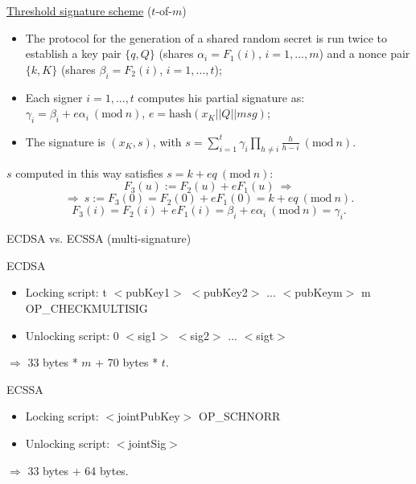 \documentclass[slidescentered]{beamer}
\begin{document}
	\begin{frame}{\hyperlink{threshold}{Threshold signature scheme} ($t$-of-$m$)}
		\begin{itemize}
			\item The protocol for the generation of a shared random secret is run twice to establish a key pair $\{q, Q\}$ (shares $\alpha_i = F_1(i)$, $i = 1, ..., m$) and a nonce pair $\{k, K\}$ (shares $\beta_i = F_2(i)$, $i = 1, ..., t$);
			\item Each signer $i = 1, ..., t$ computes his partial signature as: $\gamma_i = \beta_i + e\alpha_i \ (\text{mod} \ n)$, $e = \text{hash}(x_K || Q || msg)$;
			\item The signature is $(x_K, s)$, with $s = \sum_{i = 1}^{t}\gamma_i\prod_{h \neq i}\frac{h}{h - i} \ (\text{mod} \ n)$.
		\end{itemize}
		
		$s$ computed in this way satisfies $s = k + eq \ (\text{mod} \ n)$: 
		$$F_3(u) := F_2(u) + eF_1(u) \ \Longrightarrow$$ 
		$$\Longrightarrow \ s := F_3(0) = F_2(0) + eF_1(0) = k + eq \ (\text{mod} \ n).$$
		$$F_3(i) = F_2(i) + eF_1(i) = \beta_i + e\alpha_i \ (\text{mod} \ n) = \gamma_i.$$
	\end{frame}

	\begin{frame}{ECDSA vs. ECSSA (multi-signature)}
		\begin{block}{ECDSA}
			\begin{itemize}
				\item Locking script: t $<$pubKey1$>$ $<$pubKey2$>$ ... $<$pubKeym$>$ \hphantom{em} \hphantom{em} \hphantom{em} \hphantom{ipsem}m
				OP\_CHECKMULTISIG
				\item Unlocking script: 0 $<$sig1$>$ $<$sig2$>$ ... $<$sigt$>$
			\end{itemize}
		\end{block}
	
		$\Longrightarrow$ 33 bytes * $m$ + 70 bytes * $t$. 
		
		\bigskip
		\noindent
		\begin{block}{ECSSA}
			\begin{itemize}
				\item Locking script: $<$jointPubKey$>$ OP\_SCHNORR
				\item Unlocking script: $<$jointSig$>$
			\end{itemize}
		\end{block}
	
	 $\Longrightarrow$ 33 bytes + 64 bytes.
	\end{frame}
\end{document}

